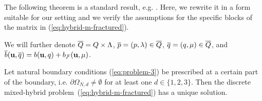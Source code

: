 The following theorem is a standard result, e.g. \cite[Theorem~1.2]%
{Brezzi-1991-MHF}. Here, we rewrite it in a form suitable for our setting and
we verify the assumptions for the specific blocks of the matrix in
(\ref{eq:hybrid-m-fractured}).

We will further denote $\overline{Q} = Q\times \Lambda$, 
$\overline{p}=(p,\lambda) \in \overline{Q}$, $\overline{q}=(q, \mu) \in \overline{Q}$, and 
$\overline{b}(\mathbf{u}, \overline{q})=b(\mathbf{u}, q) + b_{\mathcal{F}}(\mathbf{u}, \mu)$. 



\begin{theorem}
\label{th:regular} Let natural boundary conditions (\ref{eq:problem-3}) be
prescribed at a certain part of the boundary, i.e. $\partial\Omega_{N,d}
\neq\emptyset$ for at least one $d\in\{1,2,3\}$. Then the discrete
mixed-hybrid problem~(\ref{eq:hybrid-m-fractured})
has a unique solution.
\end{theorem}


